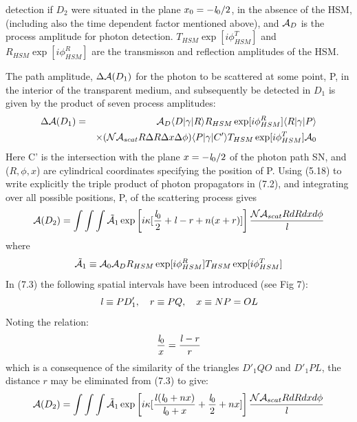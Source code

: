 \documentclass [12pt]{article}
\begin{document}
{   detection if  $D_2$ were situated in the plane $x_0 = - {\it l}_0/2$, in
   the absence of the HSM, (including also the time dependent factor mentioned above),
    and ${\cal A}_D$ is the process amplitude
   for photon detection. $T_{HSM}\exp[i\phi_{HSM}^T]$ and  $R_{HSM}\exp[i\phi_{HSM}^R]$
    are the transmisson and reflection amplitudes of the HSM. 
   \par The path amplitude, $\Delta {\cal A}(D_1)$  for the photon to be scattered at some point, P,
   in the interior of
   the transparent medium, and subsequently be detected in $D_1$ is given by the product of
    seven process amplitudes:
   \begin{eqnarray}
  \Delta {\cal A}(D_1) & = &   {\cal A}_D \langle D|\gamma|R \rangle R_{HSM}\exp[i\phi_{HSM}^R]
      \langle R|\gamma|P\rangle \nonumber \\
      &  & \times ({\cal N} {\cal A}_{scat} R \Delta R \Delta x \Delta \phi) \langle P|\gamma|C'\rangle
      T_{HSM}\exp[i\phi_{HSM}^T]{\cal A}_0
      \end{eqnarray}
       Here C' is the intersection with the plane $x = -{\it l}_0/2$ of the photon path SN, and ($R,\phi, x$) 
    are cylindrical coordinates specifying the position of P. Using (5.18) to write explicitly the triple
   product of photon propagators in (7.2), and integrating over all possible positions, P, of
   the scattering process  gives
    \begin{equation}
  {\cal A}(D_2) = \int \int \int \tilde{ {\cal A}}_1 \exp \left[i \kappa[\frac{{\it l}_0}{2}+{\it l}- r +n(x+r)]\right]
         \frac{{\cal N} {\cal A}_{scat} R dR dx d\phi}{{\it l}}
   \end{equation}
    where
 \[ \tilde{ {\cal A}}_1 \equiv {\cal A}_0 {\cal A}_D R_{HSM} \exp[i\phi_{HSM}^R] T_{HSM}\exp[i\phi_{HSM}^T] \] 
    In (7.3) the following spatial intervals have been introduced (see Fig 7):
    \[  {\it l} \equiv PD'_1,~~~ r \equiv PQ,~~~ x \equiv NP = OL \]
   Noting the relation:
    \begin{equation}
      \frac{{\it l}_0}{x} = \frac{{\it l} -r}{r}
    \end{equation}
     which is a consequence of the similarity of the triangles $D'_1QO$ and  $D'_1PL$, the distance $r$ may be
     eliminated from (7.3) to give:
    \begin{equation}
  {\cal A}(D_2) = \int \int \int \tilde{ {\cal A}}_1 
     \exp \left[i \kappa[\frac{{\it l}({\it l}_0+nx)}{{\it l}_0+x}+\frac{{\it l}_0}{2}+nx]\right]
         \frac{{\cal N} {\cal A}_{scat} R dR dx d\phi}{{\it l}}
   \end{equation}

}
\end{document}
